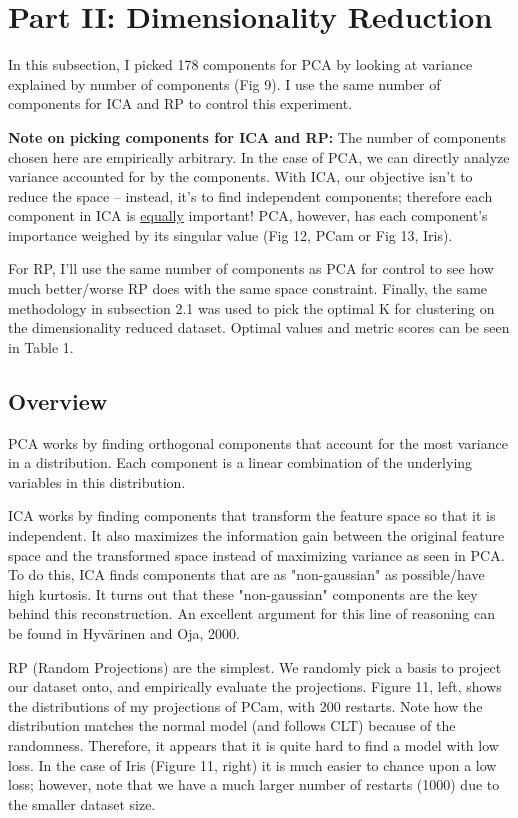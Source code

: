 \documentclass[letter]{article}
\begin{document}
\section{Part II: Dimensionality Reduction}
In this subsection, I picked 178 components for PCA by looking at variance explained by number of components (Fig 9). I use the same number of components for ICA and RP to control this experiment.

\textbf{Note on picking components for ICA and RP:} The number of components chosen here are empirically arbitrary. In the case of PCA, we can directly analyze variance accounted for by the components. With ICA, our objective isn't to reduce the space -- instead, it's to find independent components; therefore each component in ICA is \underline{equally} important! PCA, however, has each component's importance weighed by its singular value (Fig 12, PCam or Fig 13, Iris).

For RP, I'll use the same number of components as PCA for control to see how much better/worse RP does with the same space constraint. Finally, the same methodology in subsection 2.1 was used to pick the optimal K for clustering on the dimensionality reduced dataset. Optimal values and metric scores can be seen in Table 1.

\subsection{Overview}
PCA works by finding orthogonal components that account for the most variance in a distribution. Each component is a linear combination of the underlying variables in this distribution. 

ICA works by finding components that transform the feature space so that it is independent. It also maximizes the information gain between the original feature space and the transformed space instead of maximizing variance as seen in PCA. To do this, ICA finds components that are as "non-gaussian" as possible/have high kurtosis. It turns out that these "non-gaussian" components are the key behind this reconstruction. An excellent argument for this line of reasoning can be found in Hyvärinen and Oja, 2000\autocite{Hyvarinen:2000:ICA:351654.351659}.

RP (Random Projections) are the simplest. We randomly pick a basis to project our dataset onto, and empirically evaluate the projections. Figure 11, left, shows the distributions of my projections of PCam, with 200 restarts. Note how the distribution matches the normal model (and follows CLT) because of the randomness. Therefore, it appears that it is quite hard to find a model with low loss. In the case of Iris (Figure 11, right) it is much easier to chance upon a low loss; however, note that we have a much larger number of restarts (1000) due to the smaller dataset size.
\end{document}
